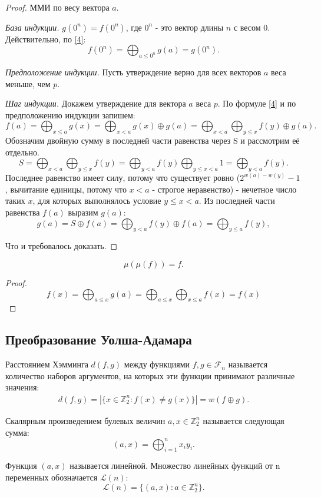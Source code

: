 \begin{proof}
    ММИ по весу вектора $a$.
    
    \textit{База индукции.} $g(0^n) = f(0^n)$, где $0^n$ - это вектор длины $n$ с весом $0$. Действительно, по \eqref{4}: 
    \[f(0^n) = \bigoplus_{a \leq 0^n}g(a) = g(0^n) .\]
    
    \textit{Предположение индукции.} Пусть утверждение верно для всех векторов $a$ веса меньше, чем $p$.
    
    \textit{Шаг индукции.} Докажем утверждение для вектора $a$ веса $p$. По формуле \eqref{4} и по предположению индукции запишем:
    \[
    f(a) = \bigoplus_{x \leq a}g(x) = \bigoplus_{x < a}g(x) \oplus g(a) = \bigoplus_{x < a}\bigoplus_{y \leq x}f(y) \oplus g(a).
    \]
    Обозначим двойную сумму в последней части равенства через S и рассмотрим её отдельно.
    \[
    S = \bigoplus_{x < a}\bigoplus_{y \leq x}f(y) = \bigoplus_{y < a}f(y)\bigoplus_{y \leq x < a} 1 = \bigoplus_{y < a}f(y).
    \]
    Последнее равенство имеет силу, потому что существует ровно ($2^{w(a)-w(y)}-1$, вычитание единицы, потому что $x < a$ - строгое неравенство) - нечетное число таких $x$, для которых выполнялось условие $y \leq x < a$. Из последней части равенства $f(a)$ выразим $g(a)$:
    \[
    g(a) = S \oplus f(a) = \bigoplus_{y < a}f(y) \oplus f(a) = \bigoplus_{y \leq a}f(y),
    \]
    
    Что и требовалось доказать. 
\end{proof}
\begin{corollary}
\[
\mu(\mu(f)) =f.
\]
\end{corollary}
\begin{proof}
    \[f(x) = \bigoplus_{a \leq x}g(a) = \bigoplus_{a \leq x} \bigoplus_{x \leq a}f(x) = f(x)\]
\end{proof}


\subsection{Преобразование Уолша-Адамара}
\begin{definition}
    Расстоянием Хэмминга $d(f,g)$ между функциями $f,g \in \mathcal{F}_n$ называется количество наборов аргументов, на которых эти функции принимают различные значения:
    \begin{align}
    d(f,g) = |\{x \in \mathbb{Z}_2^n : f(x) \neq g(x)\}| = w(f \oplus g).
    \label{d(f,g)}
    \end{align}
    
\end{definition}
\begin{definition}
    Скалярным произведением булевых величин $a,x \in \mathbb{Z}_2^n$ называется следующая сумма:
    \[
    (a,x) = \bigoplus_{i=1}^nx_iy_i.
    \]

        Функция $(a,x)$ называется линейной. Множество линейных функций от n переменных обозначается $\mathcal{L}(n)$:
    \[
    \mathcal{L}(n) = \{(a,x):a \in \mathbb{Z}_2^n\}.
    \]
\end{definition}    


